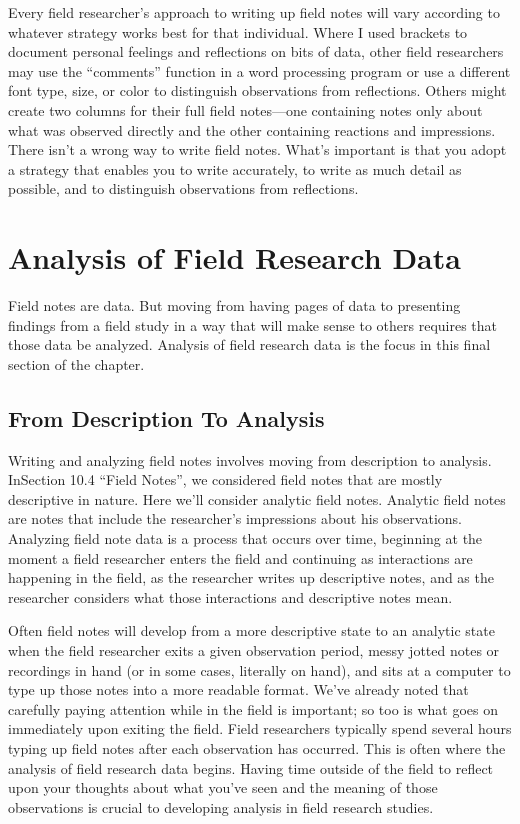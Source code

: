 Every field researcher’s approach to writing up field notes will vary according to whatever strategy works best for that individual. Where I used brackets to document personal feelings and reflections on bits of data, other field researchers may use the ``comments'' function in a word processing program or use a different font type, size, or color to distinguish observations from reflections. Others might create two columns for their full field notes—one containing notes only about what was observed directly and the other containing reactions and impressions. There isn’t a wrong way to write field notes. What’s important is that you adopt a strategy that enables you to write accurately, to write as much detail as possible, and to distinguish observations from reflections.


\section{Analysis of Field Research Data}


Field notes are data. But moving from having pages of data to presenting findings from a field study in a way that will make sense to others requires that those data be analyzed. Analysis of field research data is the focus in this final section of the chapter.

\subsection{From Description To Analysis}

Writing and analyzing field notes involves moving from description to analysis. InSection 10.4 ``Field Notes'', we considered field notes that are mostly descriptive in nature. Here we’ll consider analytic field notes. Analytic field notes are notes that include the researcher’s impressions about his observations. Analyzing field note data is a process that occurs over time, beginning at the moment a field researcher enters the field and continuing as interactions are happening in the field, as the researcher writes up descriptive notes, and as the researcher considers what those interactions and descriptive notes mean.

Often field notes will develop from a more descriptive state to an analytic state when the field researcher exits a given observation period, messy jotted notes or recordings in hand (or in some cases, literally on hand), and sits at a computer to type up those notes into a more readable format. We’ve already noted that carefully paying attention while in the field is important; so too is what goes on immediately upon exiting the field. Field researchers typically spend several hours typing up field notes after each observation has occurred. This is often where the analysis of field research data begins. Having time outside of the field to reflect upon your thoughts about what you’ve seen and the meaning of those observations is crucial to developing analysis in field research studies.

